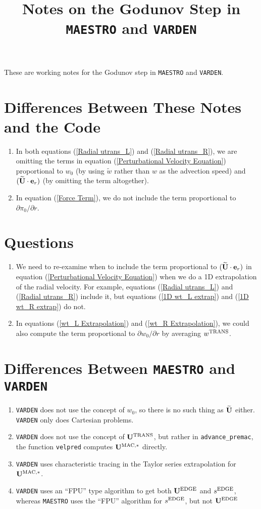\documentclass[11pt]{article}
\title{Notes on the Godunov Step in {\tt MAESTRO} and {\tt VARDEN}}
\def\edge  {\rm EDGE}
\def\mac   {\rm MAC}
\def\trans {\rm TRANS}
\def\eb    {{\bf e}}
\def\Ub    {{\bf U}}
\def\Ubt   {\widetilde{\bf U}}
\def\wt    {\tilde{w}}
\begin{document}
\maketitle
\tableofcontents
\cleardoublepage

These are working notes for the Godunov step in {\tt MAESTRO} and {\tt VARDEN}.
\section{Differences Between These Notes and the Code}
\begin{enumerate}
\item In both equations (\ref{Radial utrans_L}) and (\ref{Radial utrans_R}), we are omitting the terms in equation (\ref{Perturbational Velocity Equation}) proportional to $w_0$ (by using $\wt$ rather than $w$ as the advection speed) and $(\Ubt\cdot\eb_r)$ (by omitting the term altogether).
\item In equation (\ref{Force Term}), we do not include the term proportional to $\partial\pi_0/\partial r$.
\end{enumerate}
\section{Questions}
\begin{enumerate}
\item We need to re-examine when to include the term proportional to $(\Ubt\cdot\eb_r)$ in equation (\ref{Perturbational Velocity Equation}) when we do a 1D extrapolation of the radial velocity.  For example, equations (\ref{Radial utrans_L}) and (\ref{Radial utrans_R}) include it, but equations (\ref{1D wt_L extrap}) and (\ref{1D wt_R extrap}) do not.
\item In equations (\ref{wt_L Extrapolation}) and (\ref{wt_R Extrapolation}), we could also compute the term proportional to $\partial w_0/\partial r$ by averaging $w^{\trans}$.
\end{enumerate}
\section{Differences Between {\tt MAESTRO} and {\tt VARDEN}}
\begin{enumerate}
\item {\tt VARDEN} does not use the concept of $w_0$, so there is no such thing as $\Ubt$ either.  {\tt VARDEN} only does Cartesian problems.
\item {\tt VARDEN} does not use the concept of $\Ub^{\trans}$, but rather in {\tt advance\_premac}, the function {\tt velpred} computes $\Ub^{\mac,*}$ directly.
\item {\tt VARDEN} uses characteristic tracing in the Taylor series extrapolation for $\Ub^{\mac,*}$.
\item {\tt VARDEN} uses an ``FPU'' type algorithm to get both $\Ub^{\edge}$ and $s^{\edge}$, whereas {\tt MAESTRO} uses the ``FPU'' algorithm for $s^{\edge}$, but not $\Ub^{\edge}$
\end{enumerate}
\cleardoublepage
\end{document}
